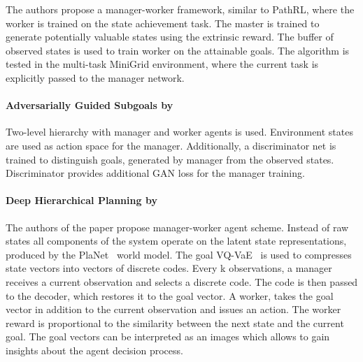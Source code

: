 \documentclass[acmsmall, nonacm]{acmart}
\begin{document}
The authors propose a manager-worker framework, similar to PathRL, where the worker is trained on the state achievement task. The master is trained to generate potentially valuable states using the extrinsic reward. The buffer of observed states is used to train worker on the attainable goals. The algorithm is tested in the multi-task MiniGrid environment, where the current task is explicitly passed to the manager network.


\paragraph{Adversarially Guided Subgoals by \citet{https://doi.org/10.48550/arxiv.2201.09635}}

Two-level hierarchy with manager and worker agents is used. Environment states are used as action space for the manager. Additionally, a discriminator net is trained to distinguish goals, generated by manager from the observed states. Discriminator provides additional GAN loss for the manager training.


\paragraph{Deep Hierarchical Planning by \citet{https://doi.org/10.48550/arxiv.2206.04114}}

The authors of the paper propose manager-worker agent scheme. Instead of raw states all components of the system operate on the latent state representations, produced by the PlaNet~\cite{hafner2019learning} world model. The goal VQ-VaE~\cite{van2017neural} is used to compresses state vectors into vectors of discrete codes. Every k observations, a manager receives a current observation and selects a discrete code. The code is then passed to the decoder, which restores it to the goal vector. A worker, takes the goal vector in addition to the current observation and issues an action. The worker reward is proportional to the similarity between the next state and the current goal. The goal vectors can be interpreted as an images which allows to gain insights about the agent decision process.




\end{document}
